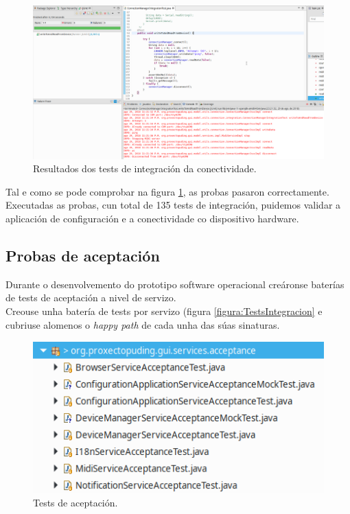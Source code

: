  \begin{figure}[htbp]
  \centering
  \includegraphics[scale=0.45,angle=90,keepaspectratio=true]{./imagenes/resultados-tests-integracion-conectividade.png}
  \caption{Resultados dos tests de integración da conectividade.}
  \label{figura:ResultadosTestsIntegracionConectividade}
 \end{figure}
 
 Tal e como se pode comprobar na figura
 \ref{figura:ResultadosTestsIntegracionConectividade}, as probas pasaron
 correctamente. \\
 
 Executadas as probas, cun total de 135 tests de integración, puidemos validar a
 aplicación de configuración e a conectividade co dispositivo hardware.
 
 \subsection{Probas de aceptación}
 
 Durante o desenvolvemento do prototipo software operacional creáronse baterías
 de tests de aceptación a nivel de servizo. \\
 
 Creouse unha batería de tests por servizo (figura \ref{figura:TestsIntegracion}
 e cubriuse alomenos o \textit{happy path} de cada unha das súas sinaturas. \\
  
 \begin{figure}[htbp]
  \centering
  \includegraphics[scale=0.8,keepaspectratio=true]{./imagenes/tests-aceptacion.png}
  \caption{Tests de aceptación.}
  \label{figura:TestsAceptacion}
 \end{figure}
 
